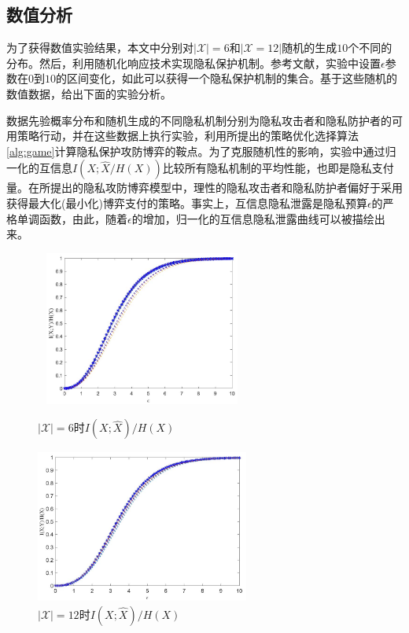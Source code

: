 \subsection{数值分析}\label{sec_numberic_simulation}
为了获得数值实验结果，本文中分别对$|\mathcal{X}|=6$和$|\mathcal{X}=12|$随机的生成$10$个不同的分布。然后，利用随机化响应技术实现隐私保护机制。参考文献，实验中设置$\epsilon$参数在$0$到$10$的区间变化，如此可以获得一个隐私保护机制的集合。基于这些随机的数值数据，给出下面的实验分析。

数据先验概率分布和随机生成的不同隐私机制分别为隐私攻击者和隐私防护者的可用策略行动，并在这些数据上执行实验，利用所提出的策略优化选择算法\ref{alg:game}计算隐私保护攻防博弈的鞍点。为了克服随机性的影响，实验中通过归一化的互信息$I(X;\hat{X}/H(X))$比较所有隐私机制的平均性能，也即是隐私支付量。在所提出的隐私攻防博弈模型中，理性的隐私攻击者和隐私防护者偏好于采用获得最大化(最小化)博弈支付的策略。事实上，互信息隐私泄露是隐私预算$\epsilon$的严格单调函数，由此，随着$\epsilon$的增加，归一化的互信息隐私泄露曲线可以被描绘出来。

\begin{figure}[htbp]
\centering
\begin{minipage}[t]{0.48\textwidth}
\centering
\includegraphics[width=7cm,height=2.0in]{./figures/Fig3.jpg}
\caption{$|\mathcal{X}|=6$时$I(X;\hat{X})/H(X)$}
\label{Fig:chapter06-3}
\end{minipage}
\begin{minipage}[t]{0.48\textwidth}
\centering
\includegraphics[width=7cm,height=2.0in]{./figures/Fig4.jpg}
\caption{$|\mathcal{X}|=12$时$I(X;\hat{X})/H(X)$}
\label{Fig:chapter06-4}
\end{minipage}
\end{figure}

